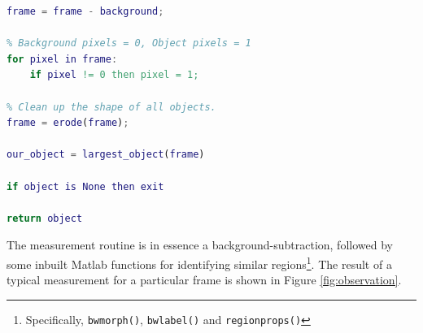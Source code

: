 \begin{lstlisting}[language=Matlab, label=lst:obs,
caption=Implementation of observation routine.]
% Subtract background from frame
frame = frame - background;

% Background pixels = 0, Object pixels = 1
for pixel in frame:
    if pixel != 0 then pixel = 1;

% Clean up the shape of all objects.
frame = erode(frame);

our_object = largest_object(frame)

if object is None then exit

return object
\end{lstlisting}

The measurement routine is in essence a background-subtraction, followed by some
inbuilt Matlab functions for identifying similar regions\footnote{Specifically,
\texttt{bwmorph()}, \texttt{bwlabel()} and \texttt{regionprops()}}. The result of a
typical measurement for a particular frame is shown in Figure \ref{fig:observation}.

